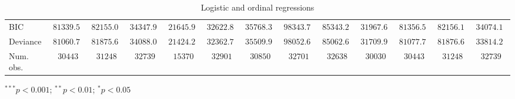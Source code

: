 \begin{table}
\begin{center}
\begin{threeparttable}
\begin{tabular}{l c c c c c c c c c c c c}
BIC                             & $81339.53$    & $82155.09$    & $34347.99$    & $21645.93$   & $32622.83$    & $35768.34$    & $98343.75$    & $85343.27$    & $31967.65$    & $81356.52$    & $82156.10$    & $34074.15$    \\
Deviance                        & $81060.79$    & $81875.65$    & $34088.09$    & $21424.20$   & $32362.79$    & $35509.92$    & $98052.68$    & $85062.65$    & $31709.91$    & $81077.78$    & $81876.65$    & $33814.24$    \\
Num. obs.                       & $30443$       & $31248$       & $32739$       & $15370$      & $32901$       & $30850$       & $32701$       & $32638$       & $30030$       & $30443$       & $31248$       & $32739$       \\
\bottomrule
\end{tabular}
\begin{tablenotes}[flushleft]
\scriptsize{\item $^{***}p<0.001$; $^{**}p<0.01$; $^{*}p<0.05$}
\end{tablenotes}
\end{threeparttable}
\caption{Logistic and ordinal regressions}
\label{table:coefficients}
\end{center}
\end{table}

